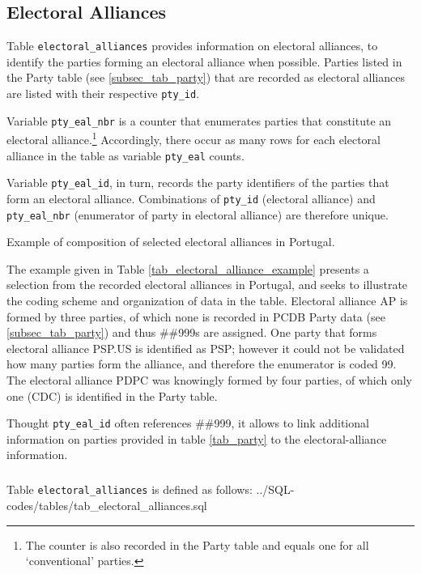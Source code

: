 \subsection{Electoral Alliances}\label{subsec_tab_electoral_alliances}

Table \texttt{electoral\_alliances} provides information on electoral alliances, to identify the parties forming an electoral alliance when possible. 
Parties listed in the Party table (see \ref{subsec_tab_party}) that are recorded as electoral alliances are listed with their respective \texttt{pty\_id}.

Variable \texttt{pty\_eal\_nbr} is a counter that enumerates parties that constitute an electoral alliance.\footnote{The counter is also recorded in the Party table and equals one for all `conventional' parties.}
Accordingly, there occur as many rows for each electoral alliance in the table as variable \texttt{pty\_eal} counts. 

Variable \texttt{pty\_eal\_id}, in turn, records the party identifiers of the parties that form an electoral alliance. 
Combinations of \texttt{pty\_id} (electoral alliance) and \texttt{pty\_eal\_nbr} (enumerator of party in electoral alliance) are therefore unique.

\begin{table}[h!]
\centering\footnotesize
\caption{Example of composition of selected electoral alliances in Portugal.}\label{tab_electoral_alliance_example}

\end{table}

The example given in Table \ref{tab_electoral_alliance_example} presents a selection from the recorded electoral alliances in Portugal, and seeks to illustrate the coding scheme and organization of data in the table.
Electoral alliance AP is formed by three parties, of which none is recorded in PCDB Party data (see \ref{subsec_tab_party}) and thus \#\#999s are assigned. One party that forms electoral alliance PSP.US is identified as PSP; however it could not be validated how many parties form the alliance, and therefore the enumerator is coded 99.
The electoral alliance PDPC was knowingly formed by four parties, of which only one (CDC) is identified in the Party table.

Thought \texttt{pty\_eal\_id} often references \#\#999, it allows to link additional information on parties provided in table \ref{tab_party} to the electoral-alliance information.

\subparagraph{}
Table \texttt{electoral\_alliances} is defined as follows:
%
{../SQL-codes/tables/tab_electoral_alliances.sql}


